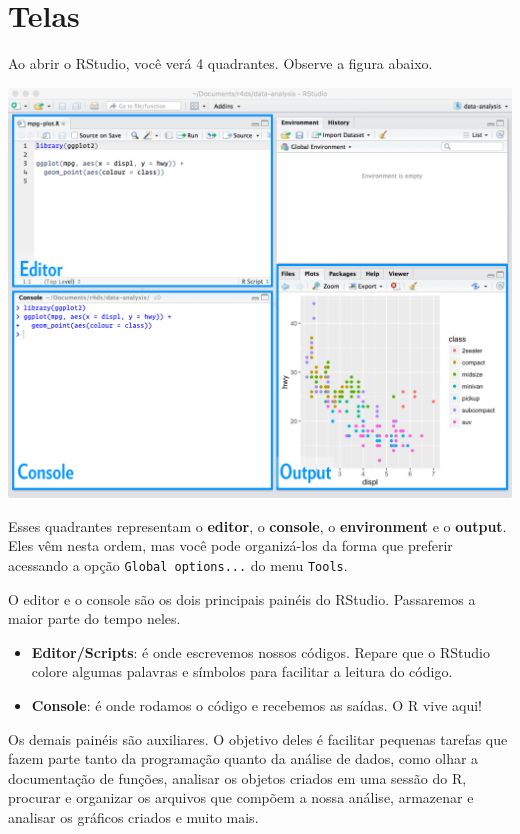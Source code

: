 \documentclass[
]{book}
\providecommand{\tightlist}{%
  \setlength{\itemsep}{0pt}\setlength{\parskip}{0pt}}
\begin{document}
\hypertarget{telas}{%
\section{Telas}\label{telas}}

Ao abrir o RStudio, você verá 4 quadrantes. Observe a figura abaixo.

\begin{center}\includegraphics[width=56.24in]{img/rstudio/rstudio-editor} \end{center}

Esses quadrantes representam o \textbf{editor}, o \textbf{console}, o \textbf{environment} e o \textbf{output}. Eles vêm nesta ordem, mas você pode organizá-los da forma que preferir acessando a opção \texttt{Global\ options...} do menu \texttt{Tools}.

O editor e o console são os dois principais painéis do RStudio. Passaremos a maior parte do tempo neles.

\begin{itemize}
\tightlist
\item
  \textbf{Editor/Scripts}: é onde escrevemos nossos códigos. Repare que o RStudio colore algumas palavras e símbolos para facilitar a leitura do código.
\item
  \textbf{Console}: é onde rodamos o código e recebemos as saídas. O R vive aqui!
\end{itemize}

Os demais painéis são auxiliares. O objetivo deles é facilitar pequenas tarefas que fazem parte tanto da programação quanto da análise de dados, como olhar a documentação de funções, analisar os objetos criados em uma sessão do R, procurar e organizar os arquivos que compõem a nossa análise, armazenar e analisar os gráficos criados e muito mais.
\end{document}
